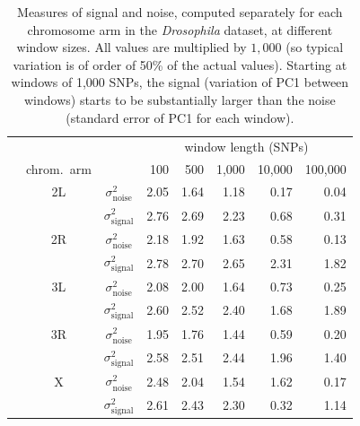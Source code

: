 \documentclass[11pt, oneside]{article}   	%
\begin{document}

\begin{table}[ht]
\centering
    \begin{tabular}{cccrrrrr}
  \hline
        & & & \multicolumn{5}{c}{window length (SNPs)} \\
 & chrom.\ arm  & & 100 & 500 & 1,000 & 10,000 & 100,000 \\ 
  \hline
    & 2L & $\sigma^2_\text{noise}$  & 2.05  &  1.64  &  1.18  &  0.17  &  0.04 \\
    & 	 & $\sigma^2_\text{signal}$ & 2.76  &  2.69  &  2.23  &  0.68  &  0.31 \\
    & 2R & $\sigma^2_\text{noise}$  & 2.18  &  1.92  &  1.63  &  0.58  &  0.13 \\
    & 	 & $\sigma^2_\text{signal}$ & 2.78  &  2.70  &  2.65  &  2.31  &  1.82 \\
    & 3L & $\sigma^2_\text{noise}$  & 2.08  &  2.00  &  1.64  &  0.73  &  0.25 \\
    & 	 & $\sigma^2_\text{signal}$ & 2.60  &  2.52  &  2.40  &  1.68  &  1.89 \\
    & 3R & $\sigma^2_\text{noise}$  & 1.95  &  1.76  &  1.44  &  0.59  &  0.20 \\
    & 	 & $\sigma^2_\text{signal}$ & 2.58  &  2.51  &  2.44  &  1.96  &  1.40 \\
    & X  & $\sigma^2_\text{noise}$  & 2.48  &  2.04  &  1.54  &  1.62  &  0.17 \\
    & 	 & $\sigma^2_\text{signal}$ & 2.61  &  2.43  &  2.30  &  0.32  &  1.14 \\
   \hline
\end{tabular}
\caption{
    Measures of signal and noise,
    computed separately for each chromosome arm in the \textit{Drosophila} dataset,
    at different window sizes.
    All values are multiplied by $1,000$
    (so typical variation is of order of 50\% of the actual values).
    Starting at windows of 1,000 SNPs, the signal (variation of PC1 between windows)
    starts to be substantially larger than the noise (standard error of PC1 for each window).
} \label{tab:window_sizes}
\end{table}
\end{document}
